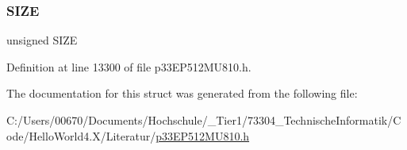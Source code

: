 \subsubsection{\texorpdfstring{S\+I\+ZE}{SIZE}}
{\footnotesize\ttfamily unsigned S\+I\+ZE}



Definition at line 13300 of file p33\+E\+P512\+M\+U810.\+h.



The documentation for this struct was generated from the following file\+:\begin{DoxyCompactItemize}
\item 
C\+:/\+Users/00670/\+Documents/\+Hochschule/\+\_\+\+Tier1/73304\+\_\+\+Technische\+Informatik/\+Code/\+Hello\+World4.\+X/\+Literatur/\hyperlink{p33_e_p512_m_u810_8h}{p33\+E\+P512\+M\+U810.\+h}\end{DoxyCompactItemize}
